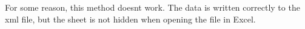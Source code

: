 
\begin{DoxyRefList}
\item[Member \mbox{\hyperlink{class_open_x_l_s_x_1_1_x_l_sheet_a839cb51e0f01900e7533f8b873487dee}{Open\+XLSX\+::XLSheet\+::set\+Visibility}} (XLSheet\+State state)]\label{bug__bug000001}%
%
For some reason, this method doesn\textquotesingle{}t work. The data is written correctly to the xml file, but the sheet is not hidden when opening the file in Excel. 
\end{DoxyRefList}